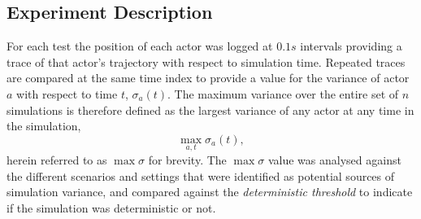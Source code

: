 \documentclass[letterpaper, 10 pt, journal, twoside]{IEEEtran}
\begin{document}
\subsection{Experiment Description}\label{s:Experiment_Description}
For each test the position of each actor was logged at $0.1s$ intervals providing a trace of that actor's trajectory with respect to simulation time. Repeated traces are compared at the same time index to provide a value for the variance of actor $a$ with respect to time $t$, $\sigma_a(t)$. The maximum variance over the entire set of $n$ simulations is therefore defined as the largest variance of any actor at any time in the simulation, 
\begin{equation} \label{eq:max_sigma}
\max_{a,t}\sigma_a(t), 
\end{equation}
herein referred to as $\max\sigma$ for brevity.
The $\max\sigma$ value was analysed against the different scenarios and settings that were identified as potential sources of simulation variance, and compared against the \textit{deterministic threshold} to indicate if the simulation was deterministic or not. 
%



\end{document}
